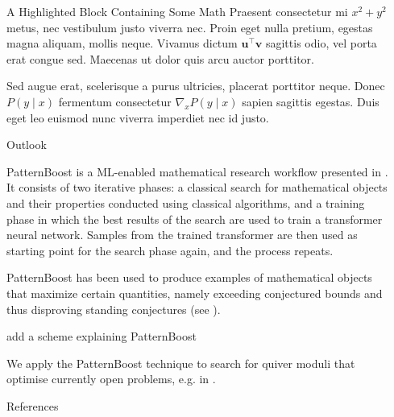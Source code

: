 \documentclass[final,20pt]{beamer}
\newcommand{\todo}[1]{{\color{blue}#1}}
\newlength{\sepwidth}
\newlength{\colwidth}
\newcommand{\separatorcolumn}{\begin{column}{\sepwidth}\end{column}}
\begin{document}
\begin{frame}[t]
\begin{columns}[t]
\begin{column}{\colwidth}
\begin{exampleblock}{A Highlighted Block Containing Some Math}
    Praesent consectetur mi $x^2 + y^2$ metus, nec vestibulum justo viverra
    nec. Proin eget nulla pretium, egestas magna aliquam, mollis neque. Vivamus
    dictum $\mathbf{u}^\intercal\mathbf{v}$ sagittis odio, vel porta erat
    congue sed. Maecenas ut dolor quis arcu auctor porttitor.


    Sed augue erat, scelerisque a purus ultricies, placerat porttitor neque.
    Donec $P(y \mid x)$ fermentum consectetur $\nabla_x P(y \mid x)$ sapien
    sagittis egestas. Duis eget leo euismod nunc viverra imperdiet nec id
    justo.

  \end{exampleblock}

  \begin{block}{Outlook}

    PatternBoost is a ML-enabled mathematical research workflow
    presented in \cite{2411.00566}.
    It consists of two iterative phases:
    a classical search for mathematical objects
    and their properties conducted using classical algorithms,
    and a training phase
    in which the best results of the search
    are used to train a transformer neural network.
    Samples from the trained transformer are
    then used as starting point for the search phase again,
    and the process repeats.

    PatternBoost has been used to produce examples of mathematical objects
    that maximize certain quantities, namely exceeding conjectured bounds
    and thus disproving standing conjectures (see \cite[Section~3.3]{2411.00566}).

    \todo{add a scheme explaining PatternBoost}

    We apply the PatternBoost technique to search for quiver moduli
    that optimise currently open problems, e.g. in \cite{2311.17003}.
  \end{block}

  \begin{block}{References}

  \printbibliography

  \end{block}

\end{column}

\separatorcolumn
\end{columns}
\end{frame}
\end{document}
